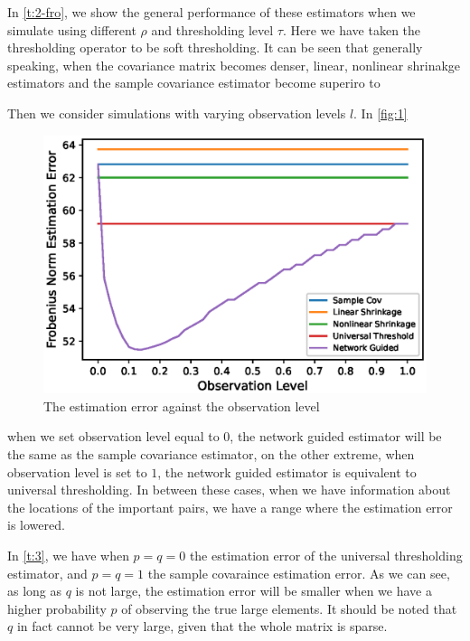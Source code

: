

In \autoref{t:2-fro}, we show the general performance of these estimators when we simulate using different \(\rho\) and thresholding level \(\tau\). Here we have taken the thresholding operator to be soft thresholding. It can be seen that generally speaking, when the covariance matrix becomes denser, linear, nonlinear shrinakge estimators and the sample covariance estimator become superiro to 

Then we consider simulations with varying observation levels \(l\). In \autoref{fig:1}
\begin{figure}[htbp]
     \centering
     \includegraphics{asset/observation-level.eps}
     \caption{The estimation error against the observation level}
     \label{fig:1}
\end{figure}
when we set observation level equal to \(0\), the network guided estimator will be the same as the sample covariance estimator, on the other extreme, when observation level is set to \(1\), the network guided estimator is equivalent to universal thresholding. In between these cases, when we have information about the locations of the important pairs, we have a range where the estimation error is lowered. 



In \autoref{t:3}, we have when \(p = q = 0\) the estimation error of the universal thresholding estimator, and \(p =q =1\) the sample covaraince estimation error. As we can see, as long as \(q\) is not large, the estimation error will be smaller when we have a higher probability \(p\) of observing the true large elements. It should be noted that \(q\) in fact cannot be very large, given that the whole matrix is sparse. 
